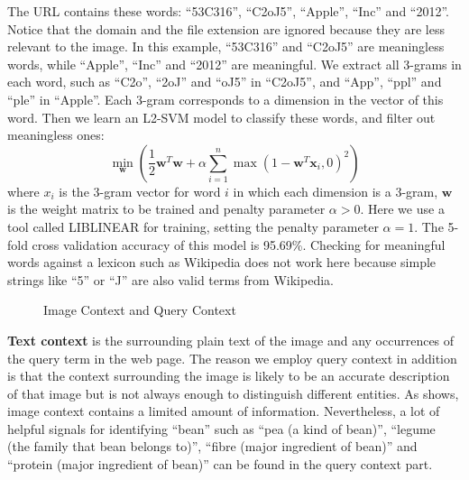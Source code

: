 The URL contains these words: ``53C316'', ``C2oJ5'', ``Apple'',
``Inc'' and ``2012''.
Notice that the domain and the file extension are ignored because they are less
relevant to the image.
In this example, ``53C316'' and ``C2oJ5'' are meaningless words,
while ``Apple'', ``Inc'' and ``2012'' are meaningful.
We extract all 3-grams in each word, such as
``C2o'', ``2oJ'' and ``oJ5'' in ``C2oJ5'',
and ``App'', ``ppl'' and ``ple'' in ``Apple''.
Each 3-gram corresponds to a dimension in the vector of this word.
Then we learn an L2-SVM model to classify these words,
and filter out meaningless
ones:
\begin{equation}
\min_{\mathbf{w}}\left(\frac{1}{2}\mathbf{w}^T\mathbf{w}+
\alpha\sum_{i=1}^{n}\max(1-\mathbf{w}^T\mathbf{x}_i, 0)^2\right)
\end{equation}
where $x_i$ is the 3-gram vector for word $i$ in which each
dimension is a 3-gram, $\mathbf{w}$ is the weight matrix to be trained
and penalty parameter $\alpha > 0$.
Here we use a tool called LIBLINEAR \cite{liblinear} for training,
setting the penalty parameter $\alpha = 1$.
The 5-fold cross validation accuracy of this model is 95.69\%.
Checking for meaningful words against a lexicon such as Wikipedia does not work
here because simple strings like ``5'' or ``J'' are also valid terms from Wikipedia.

\begin{figure}[th]
	\centerline{}
	\caption{Image Context and Query Context}
	\label{fig:context-bean}
\vspace*{-3mm}
\end{figure}


\textbf{Text context} is the surrounding plain text of the image and any occurrences
of the query term in the web page.
The reason we employ
query context in addition is that the context surrounding the image is likely
to be an accurate description of that image but is not always enough to
distinguish different entities.
As  shows, image context contains a limited amount of
information. Nevertheless, a lot of helpful signals for identifying ``bean'' such as
``pea (a kind of bean)'',
``legume (the family that bean belongs to)'',
``fibre (major ingredient of bean)'' and
``protein (major ingredient of bean)''
can be found in the query context part.


